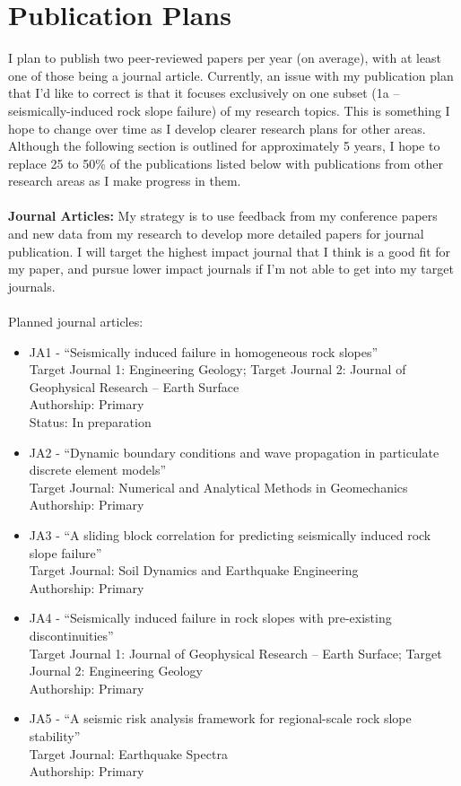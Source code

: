 \documentclass[10pt,letterpaper]{article}
\begin{document}
\section{Publication Plans}
I plan to publish two peer-reviewed papers per year (on average), with at least one of those being a journal article.
Currently, an issue with my publication plan that I'd like to correct is that it focuses exclusively on one subset (1a -- seismically-induced rock slope failure) of my research topics.
This is something I hope to change over time as I develop clearer research plans for other areas. 
Although the following section is outlined for approximately 5 years, I hope to replace 25 to 50\% of the publications listed below with publications from other research areas as I make progress in them.
\\
\\
\noindent \textbf{Journal Articles:} My strategy is to use feedback from my conference papers and new data from my research to develop more detailed papers for journal publication. 
I will target the highest impact journal that I think is a good fit for my paper, and pursue lower impact journals if I'm not able to get into my target journals.
\\
\\
\noindent Planned journal articles:
\begin{itemize}
\item JA1 - ``Seismically induced failure in homogeneous rock slopes''
\\Target Journal 1: Engineering Geology; Target Journal 2: Journal of Geophysical Research -- Earth Surface
\\ Authorship: Primary
\\ Status: In preparation
\item JA2 - ``Dynamic boundary conditions and wave propagation in particulate discrete element models''
\\Target Journal: Numerical and Analytical Methods in Geomechanics
\\ Authorship: Primary
\item JA3 - ``A sliding block correlation for predicting seismically induced rock slope failure''
\\ Target Journal: Soil Dynamics and Earthquake Engineering
\\ Authorship: Primary
\item JA4 - ``Seismically induced failure in rock slopes with pre-existing discontinuities''
\\ Target Journal 1: Journal of Geophysical Research -- Earth Surface; Target Journal 2: Engineering Geology
\\ Authorship: Primary
\item JA5 - ``A seismic risk analysis framework for regional-scale rock slope stability''
\\ Target Journal: Earthquake Spectra
\\ Authorship: Primary
\end{itemize}
\end{document}
